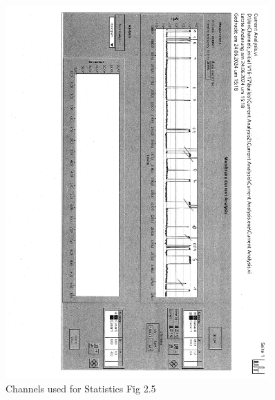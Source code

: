 \documentclass[a4paper,english,12pt,bibliography=totoc]{scrreprt}
\begin{document}
\begin{figure}[H]
    \centering
    \includegraphics[angle=90,width = 0.9\textwidth]{Analysis/ilovepdf_pages-to-jpg/doc00131020240719122038-1_page-0003.jpg}
    \caption{Channels used for Statistics Fig 2.5}
    \label{fig:enter-label}
\end{figure}
\end{document}

